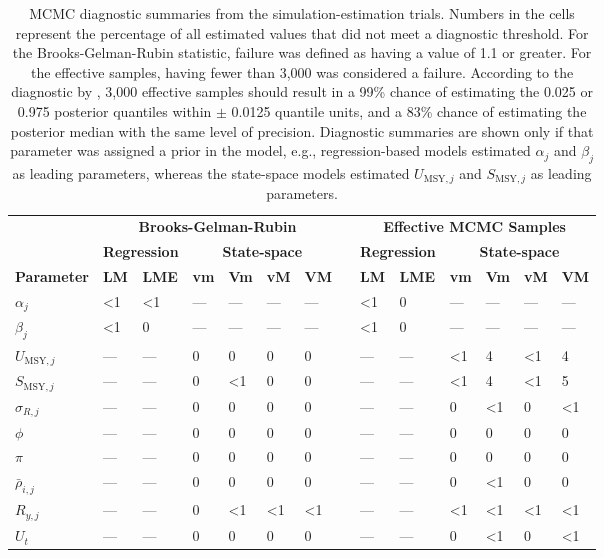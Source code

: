 \documentclass[12pt,]{book}
\theoremstyle{definition}
\theoremstyle{definition}
\theoremstyle{definition}
\theoremstyle{remark}
\begin{document}
\begin{table}

\caption{\label{tab:mcmc-diag-table}MCMC diagnostic summaries from the simulation-estimation trials. Numbers in the cells represent the percentage of all estimated values that did not meet a diagnostic threshold. For the Brooks-Gelman-Rubin statistic, failure was defined as having a value of 1.1 or greater. For the effective samples, having fewer than 3,000 was considered a failure. According to the diagnostic by \cite{raftery-lewis-1992}, 3,000 effective samples should result in a 99\% chance of estimating the 0.025 or 0.975 posterior quantiles within $\pm$ 0.0125 quantile units, and a 83\% chance of estimating the posterior median with the same level of precision. Diagnostic summaries are shown only if that parameter was assigned a prior in the model, e.g., regression-based models estimated $\alpha_j$ and $\beta_j$ as leading parameters, whereas the state-space models estimated $U_{\text{MSY},j}$ and $S_{\text{MSY},j}$ as leading parameters.}
\centering
\begin{tabular}[t]{llllllllllllll}
\toprule
\multicolumn{1}{c}{\bfseries } & \multicolumn{6}{c}{\bfseries Brooks-Gelman-Rubin} & \multicolumn{1}{c}{\bfseries } & \multicolumn{6}{c}{\bfseries Effective MCMC Samples} \\
\cmidrule(l{2pt}r{2pt}){2-7} \cmidrule(l{2pt}r{2pt}){9-14}
\multicolumn{1}{c}{\bfseries } & \multicolumn{2}{c}{\bfseries Regression} & \multicolumn{4}{c}{\bfseries State-space} & \multicolumn{1}{c}{\bfseries  } & \multicolumn{2}{c}{\bfseries Regression} & \multicolumn{4}{c}{\bfseries State-space} \\
\cmidrule(l{2pt}r{2pt}){2-3} \cmidrule(l{2pt}r{2pt}){4-7} \cmidrule(l{2pt}r{2pt}){9-10} \cmidrule(l{2pt}r{2pt}){11-14}
\textbf{Parameter} & \textbf{LM} & \textbf{LME} & \textbf{vm} & \textbf{Vm} & \textbf{vM} & \textbf{VM} &   & \textbf{LM} & \textbf{LME} & \textbf{vm} & \textbf{Vm} & \textbf{vM} & \textbf{VM}\\
\midrule
$\alpha_j$ & <1 & <1 & --- & --- & --- & --- &  & <1 & 0 & --- & --- & --- & ---\\
$\beta_j$ & <1 & 0 & --- & --- & --- & --- &  & <1 & 0 & --- & --- & --- & ---\\
$U_{\text{MSY},j}$ & --- & --- & 0 & 0 & 0 & 0 &  & --- & --- & <1 & 4 & <1 & 4\\
$S_{\text{MSY},j}$ & --- & --- & 0 & <1 & 0 & 0 &  & --- & --- & <1 & 4 & <1 & 5\\
$\sigma_{R,j}$ & --- & --- & 0 & 0 & 0 & 0 &  & --- & --- & 0 & <1 & 0 & <1\\
$\phi$ & --- & --- & 0 & 0 & 0 & 0 &  & --- & --- & 0 & 0 & 0 & 0\\
$\pi$ & --- & --- & 0 & 0 & 0 & 0 &  & --- & --- & 0 & 0 & 0 & 0\\
$\bar{\rho}_{i,j}$ & --- & --- & 0 & 0 & 0 & 0 &  & --- & --- & 0 & <1 & 0 & 0\\
$R_{y,j}$ & --- & --- & 0 & <1 & <1 & <1 &  & --- & --- & <1 & <1 & <1 & <1\\
$U_{t}$ & --- & --- & 0 & 0 & 0 & 0 &  & --- & --- & 0 & <1 & 0 & <1\\
\bottomrule
\end{tabular}
\end{table}
\end{document}
